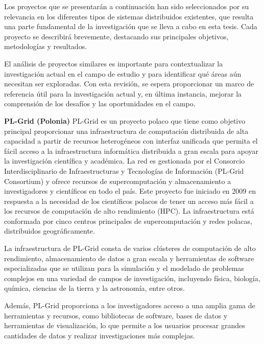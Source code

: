 \begin{doublespace}
\begin{multicols}{2}
  Los proyectos que se presentarán a continuación han sido seleccionados por su relevancia en los diferentes tipos de sistemas distribuidos existentes, que resulta una parte fundamental de la investigación que se lleva a cabo en esta tesis. Cada proyecto se describirá brevemente, destacando sus principales objetivos, metodologías y resultados.

  El análisis de proyectos similares es importante para contextualizar la investigación actual en el campo de estudio y para identificar qué áreas aún necesitan ser exploradas. Con esta revisión, se espera proporcionar un marco de referencia útil para la investigación actual y, en última instancia, mejorar la comprensión de los desafíos y las oportunidades en el campo.

  \vspace{3mm}

\textbf{PL-Grid (Polonia)}
  \newline
  PL-Grid es un proyecto polaco que tiene como objetivo principal proporcionar una infraestructura de computación distribuida de alta capacidad a partir de recursos heterogéneos con interfaz unificada que permita el fácil acceso a la infraestructura informática distribuida a gran escala para apoyar la investigación científica y académica. La red es gestionada por el Consorcio Interdisciplinario de Infraestructuras y Tecnologías de Información (PL-Grid Consortium) y ofrece recursos de supercomputación y almacenamiento a investigadores y científicos en todo el país. Este proyecto fue iniciado en 2009 en respuesta a la necesidad de los científicos polacos de tener un acceso más fácil a los recursos de computación de alto rendimiento (HPC). La infraestructura está conformada por cinco centros principales de supercomputación y redes polacas, distribuidos geográficamente.
  
  La infraestructura de PL-Grid consta de varios clústeres de computación de alto rendimiento, almacenamiento de datos a gran escala y herramientas de software especializadas que se utilizan para la simulación y el modelado de problemas complejos en una variedad de campos de investigación, incluyendo física, biología, química, ciencias de la tierra y la astronomía, entre otros.
  
  Además, PL-Grid proporciona a los investigadores acceso a una amplia gama de herramientas y recursos, como bibliotecas de software, bases de datos y herramientas de visualización, lo que permite a los usuarios procesar grandes cantidades de datos y realizar investigaciones más complejas.
  

\end{multicols}
\end{doublespace}
